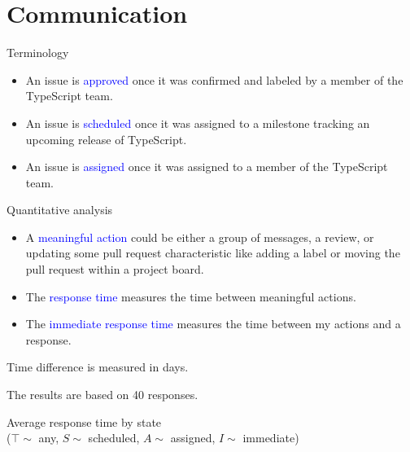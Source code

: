 \documentclass{beamer}
\theoremstyle{definition}
\def\padding{\vspace{0.5cm}}
\def\b{\textcolor{blue}}
\begin{document}
\section{Communication}
\begin{frame}{Terminology}\pause
\begin{itemize}
    \item An issue is \b{approved} once it was confirmed and labeled by a member of the TypeScript team.\pause
    \item An issue is \b{scheduled} once it was assigned to a milestone tracking an upcoming release of TypeScript.\pause
    \item An issue is \b{assigned} once it was assigned to a member of the TypeScript team.
\end{itemize}
\end{frame}
\begin{frame}{Quantitative analysis}\pause
\begin{itemize}
    \item A \b{meaningful action} could be either a group of messages, a review, or updating some pull request characteristic like adding a label or moving the pull request within a project board.\pause
    \item The \b{response time} measures the time between meaningful actions.\pause
    \item The \b{immediate response time} measures the time between my actions and a response.
\end{itemize}\pause

\padding

Time difference is measured in days.\pause

The results are based on 40 responses.
\end{frame}
\begin{frame}{}
\centering
{}
\centering
Average response time by state \\ ($\top \sim$ any, $S \sim$ scheduled, $A \sim$ assigned, $I \sim$ immediate)
\end{frame}
\end{document}
